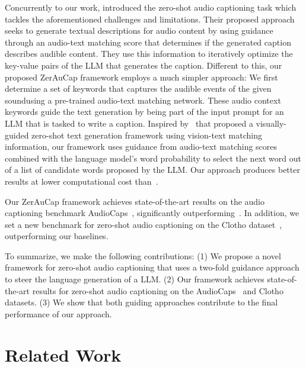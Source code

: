 \documentclass{article}
\newcommand{\modelName}{ZerAuCap\xspace}
\begin{document}
Concurrently to our work,
\cite{shaharabany2023zero} introduced the zero-shot audio captioning task which tackles the aforementioned challenges and limitations. Their proposed approach seeks to generate textual descriptions for audio content by using guidance through an audio-text matching score that determines if the generated caption describes audible content. They use this information to iteratively optimize the key-value pairs of the LLM that generates the caption.
Different to this, our proposed \modelName framework employs a much simpler approach: We first determine a set of keywords that captures the audible events of the given soundusing a pre-trained audio-text matching network. These audio context keywords guide the text generation by being part of the input prompt for an LLM that is tasked to write a caption. Inspired by~\cite{Salewski2023ZeroshotTranslation,Su2022LanguageMC} that proposed a visually-guided zero-shot text generation framework using vision-text matching information, our framework
uses guidance from audio-text matching scores combined with the language model's word probability to select the next word out of a list of candidate words proposed by the LLM\@.
Our approach produces better results at lower computational cost than~\cite{shaharabany2023zero}.


Our \modelName framework achieves state-of-the-art results on the audio captioning benchmark AudioCaps~\cite{kim2019audiocaps}, significantly outperforming~\cite{shaharabany2023zero}. In addition, we set a new benchmark for zero-shot audio captioning on the Clotho dataset~\cite{drossos2020clotho}, outperforming our baselines.

To summarize, we make the following contributions: (1) We propose a novel framework for zero-shot audio captioning that uses a two-fold guidance approach to steer the language generation of a LLM\@. (2) Our framework achieves state-of-the-art results for zero-shot audio captioning on the AudioCaps~\cite{kim2019audiocaps} and Clotho~\cite{drossos2020clotho} datasets. (3) We show that both guiding approaches contribute to the final performance of our approach.

\section{Related Work}
\end{document}
